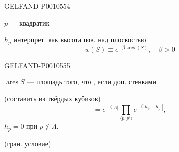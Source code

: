 \begin{GelfandAdjacentEvidence}{GELFAND-P001055}{4}

$p$ — квадратик

$h_p$ интерпрет. как высота пов. над плоскостью
\begin{equation*}
w(S)\equiv e^{-\beta\operatorname{ares}(S)},\quad\beta>0
\tag{2}
\end{equation*}
\end{GelfandAdjacentEvidence}
\begin{GelfandAdjacentEvidence}{GELFAND-P001055}{5}

$\operatorname{ares} S$ — площадь того, что , если доп.
 стенками
\end{GelfandAdjacentEvidence}


(составить из твёрдых кубиков)
\begin{equation*}
=e^{-\beta|\Lambda|}\prod_{\langle p,p'\rangle}e^{-\beta|h_p-h_{p'}|},
\tag{3}
\end{equation*}
$h_p=0$ при $p\notin\Lambda$.

(гран. условие)


